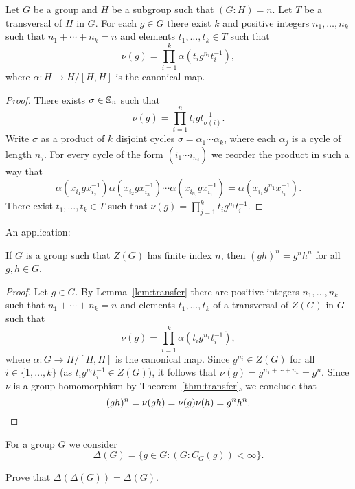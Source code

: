 \begin{lemma}
	\label{lem:transfer}
	Let $G$ be a group and $H$ be a subgroup such that $(G:H)=n$. Let 
	$T$ be a transversal of $H$ in $G$. 
	For each $g\in G$ there exist $k$ and 
	positive integers 
	$n_1,\dots,n_k$ such that $n_1+\cdots+n_k=n$ and elements 
	$t_1,\dots,t_k\in T$ such that  
	\[
		\nu(g)=\prod_{i=1}^k \alpha(t_ig^{n_i}t_i^{-1}),
	\]
	where $\alpha\colon H\to H/[H,H]$ is the canonical map.
\end{lemma}

\begin{proof}
	There exists $\sigma\in\mathbb{S}_n$ such that 
	\[
	\nu(g)=\prod_{i=1}^n t_igt_{\sigma(i)}^{-1}. 
	\]
	Write $\sigma$ as a product of $k$ disjoint cycles
	$\sigma=\alpha_1\cdots\alpha_k$, where each $\alpha_j$ is a cycle of length 
	$n_j$. For every cycle of the form $(i_1\cdots i_{n_j})$
	we reorder the product in such a way that 
	\[
		\alpha(x_{i_1}gx_{i_2}^{-1})\alpha(x_{i_2}gx_{i_3}^{-1})\cdots \alpha(x_{i_{n_j}}gx_{i_1}^{-1})=\alpha(x_{i_1}g^{n_1}x_{i_1}^{-1}).
	\]
	There exist $t_1,\dots,t_k\in T$ such that 
	$\nu(g)=\prod_{j=1}^k t_ig^{n_i}t_i^{-1}$. 
\end{proof}

An application:

\begin{proposition}
	\label{pro:center}
	If $G$ is a group such that $Z(G)$ has finite index $n$, then
	$(gh)^n=g^nh^n$ for all $g,h\in G$.	
\end{proposition}

\begin{proof}
	Let $g\in G$. By Lemma~\ref{lem:transfer} there are positive integers 
    $n_1,\dots,n_k$ such that $n_1+\cdots+n_k=n$ and elements 
	$t_1,\dots,t_k$ of a transversal of $Z(G)$ in $G$ such that 
	\[
		\nu(g)=\prod_{i=1}^k \alpha(t_ig^{n_1}t_i^{-1}),
	\]
	where $\alpha\colon G\to H/[H,H]$ is the canonical map. Since
	$g^{n_i}\in Z(G)$ for all $i\in\{1,\dots,k\}$ (as $t_ig^{n_i}t_i^{-1}\in Z(G)$), 
	it follows that 
	$\nu(g)=g^{n_1+\cdots+n_k}=g^n$.  Since $\nu$ is a group homomorphism by 
	Theorem~\ref{thm:transfer}, we conclude that 
	\[
		(gh)^n=\nu(gh)=\nu(g)\nu(h)=g^nh^n. \qedhere 
	\]
\end{proof}

For a group $G$ we consider 
\[
	\Delta(G)=\{g\in G:(G:C_G(g))<\infty\}.
\]

\begin{exercise}
	Prove that $\Delta(\Delta(G))=\Delta(G)$.
\end{exercise}

